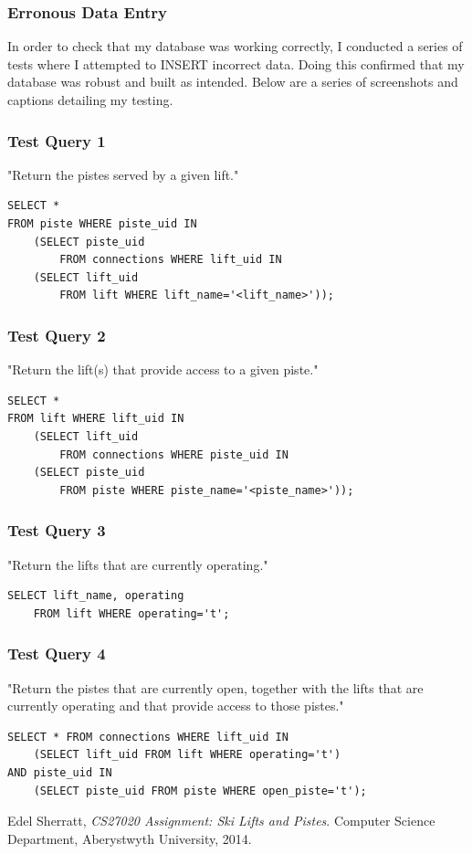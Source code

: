 \documentclass[11pt]{scrartcl} %
\begin{document}
\subsubsection{Erronous Data Entry}
In order to check that my database was working correctly, I conducted a series of tests where I attempted to INSERT incorrect data. Doing this confirmed that my database was robust and built as intended. Below are a series of screenshots and captions detailing my testing.

\subsubsection{Test Query 1}
"Return the pistes served by a given lift."
\begin{lstlisting}
SELECT * 
FROM piste WHERE piste_uid IN 
	(SELECT piste_uid
		FROM connections WHERE lift_uid IN 
	(SELECT lift_uid
		FROM lift WHERE lift_name='<lift_name>'));
\end{lstlisting}
\subsubsection{Test Query 2}
"Return the lift(s) that provide access to a given piste."
\begin{lstlisting}
SELECT * 
FROM lift WHERE lift_uid IN 
	(SELECT lift_uid 
		FROM connections WHERE piste_uid IN 
	(SELECT piste_uid 
		FROM piste WHERE piste_name='<piste_name>'));
\end{lstlisting}
\subsubsection{Test Query 3}
"Return the lifts that are currently operating."
\begin{lstlisting}
SELECT lift_name, operating 
	FROM lift WHERE operating='t';
\end{lstlisting}
\subsubsection{Test Query 4}
"Return the pistes that are currently open, together with the lifts that are currently operating and that provide access to those pistes."
\begin{lstlisting}
SELECT * FROM connections WHERE lift_uid IN
	(SELECT lift_uid FROM lift WHERE operating='t')
AND piste_uid IN
	(SELECT piste_uid FROM piste WHERE open_piste='t');
\end{lstlisting}
\newpage

\begin{thebibliography}{9}

  Edel Sherratt,
  \emph{CS27020 Assignment: Ski Lifts and Pistes}.
  Computer Science Department,
  Aberystwyth University,
  2014.

\end{thebibliography}
\end{document}
